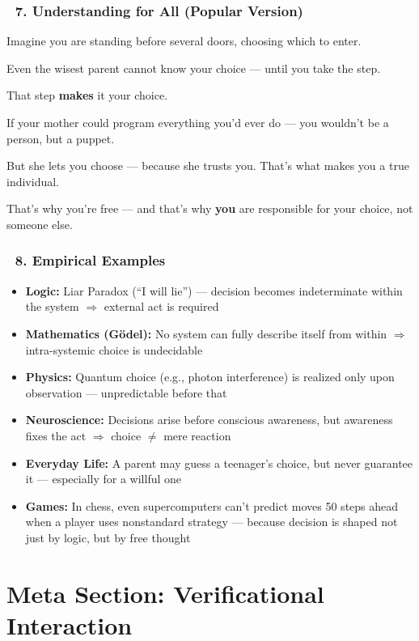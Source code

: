 \documentclass[12pt]{article}
\begin{document}
\subsubsection*{🔹 7. Understanding for All (Popular Version)}

Imagine you are standing before several doors, choosing which to enter.

Even the wisest parent cannot know your choice — until you take the step.

That step \textbf{makes} it your choice.

If your mother could program everything you’d ever do — you wouldn’t be a person, but a puppet.

But she lets you choose — because she trusts you. That’s what makes you a true individual.

That’s why you’re free — and that’s why \textbf{you} are responsible for your choice, not someone else.

\subsubsection*{🔹 8. Empirical Examples}

\begin{itemize}
\item \textbf{Logic:} Liar Paradox (``I will lie'') — decision becomes indeterminate within the system $\Rightarrow$ external act is required
\item \textbf{Mathematics (Gödel):} No system can fully describe itself from within $\Rightarrow$ intra-systemic choice is undecidable
\item \textbf{Physics:} Quantum choice (e.g., photon interference) is realized only upon observation — unpredictable before that
\item \textbf{Neuroscience:} Decisions arise before conscious awareness, but awareness fixes the act $\Rightarrow$ choice $\neq$ mere reaction
\item \textbf{Everyday Life:} A parent may guess a teenager’s choice, but never guarantee it — especially for a willful one
\item \textbf{Games:} In chess, even supercomputers can’t predict moves 50 steps ahead when a player uses nonstandard strategy — because decision is shaped not just by logic, but by free thought
\end{itemize}


\section*{Meta Section: Verificational Interaction}
\end{document}
